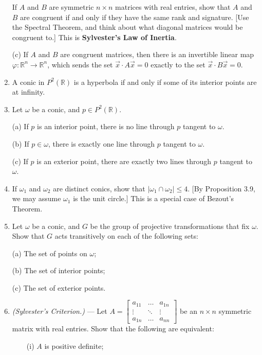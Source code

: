 \documentclass[leqno]{book}
\begin{document}
\begin{enumerate}
If $A$ and $B$ are symmetric $n\times n$ matrices with real entries, show that $A$ and $B$ are congruent if and only if they have the same rank and signature.  [Use the Spectral Theorem, and think about what diagonal matrices would be congruent to.]  This is \textbf{Sylvester's Law of Inertia}.

(c) If $A$ and $B$ are congruent matrices, then there is an invertible linear map $\varphi:\mathbb R^n\to\mathbb R^n$, which sends the set $\vec x\cdot A\vec x=0$ exactly to the set $\vec x\cdot B\vec x=0$.

\item A conic in $P^2(\mathbb R)$ is a hyperbola if and only if some of its interior points are at infinity.

\item Let $\omega$ be a conic, and $p\in P^2(\mathbb R)$.

(a) If $p$ is an interior point, there is no line through $p$ tangent to $\omega$.

(b) If $p\in\omega$, there is exactly one line through $p$ tangent to $\omega$.

(c) If $p$ is an exterior point, there are exactly two lines through $p$ tangent to $\omega$.

\item If $\omega_1$ and $\omega_2$ are distinct conics, show that $|\omega_1\cap\omega_2|\leqslant 4$.  [By Proposition 3.9, we may assume $\omega_1$ is the unit circle.]  This is a special case of Bezout's Theorem.

\item Let $\omega$ be a conic, and $G$ be the group of projective transformations that fix $\omega$.  Show that $G$ acts transitively on each of the following sets:

(a) The set of points on $\omega$;

(b) The set of interior points;

(c) The set of exterior points.

\item\emph{(Sylvester's Criterion.)} \---- Let $A=\begin{bmatrix}a_{11}&\dots&a_{1n}\\\vdots&\ddots&\vdots\\a_{1n}&\dots&a_{nn}\end{bmatrix}$ be an $n\times n$ symmetric matrix with real entries.  Show that the following are equivalent:

~~~~(i) $A$ is positive definite;


\end{enumerate}
\end{document}
